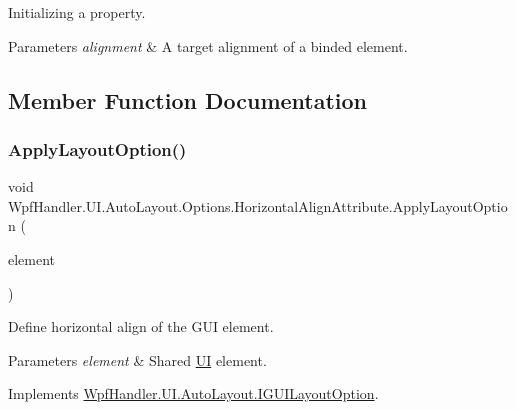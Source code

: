 Initializing a property. 


\begin{DoxyParams}{Parameters}
{\em alignment} & A target alignment of a binded element.\\
\hline
\end{DoxyParams}


\subsection{Member Function Documentation}
\mbox{\label{class_wpf_handler_1_1_u_i_1_1_auto_layout_1_1_options_1_1_horizontal_align_attribute_a53335e3d47b8509f6ce67ad93044a760}} 
\subsubsection{\texorpdfstring{Apply\+Layout\+Option()}{ApplyLayoutOption()}}
{\footnotesize\ttfamily void Wpf\+Handler.\+U\+I.\+Auto\+Layout.\+Options.\+Horizontal\+Align\+Attribute.\+Apply\+Layout\+Option (\begin{DoxyParamCaption}\item[{Framework\+Element}]{element }\end{DoxyParamCaption})}



Define horizontal align of the G\+UI element. 


\begin{DoxyParams}{Parameters}
{\em element} & Shared \mbox{\hyperlink{namespace_wpf_handler_1_1_u_i}{UI}} element.\\
\hline
\end{DoxyParams}


Implements \mbox{\hyperlink{interface_wpf_handler_1_1_u_i_1_1_auto_layout_1_1_i_g_u_i_layout_option_ac2d2fa8aeaf753b3248381399f991005}{Wpf\+Handler.\+U\+I.\+Auto\+Layout.\+I\+G\+U\+I\+Layout\+Option}}.



